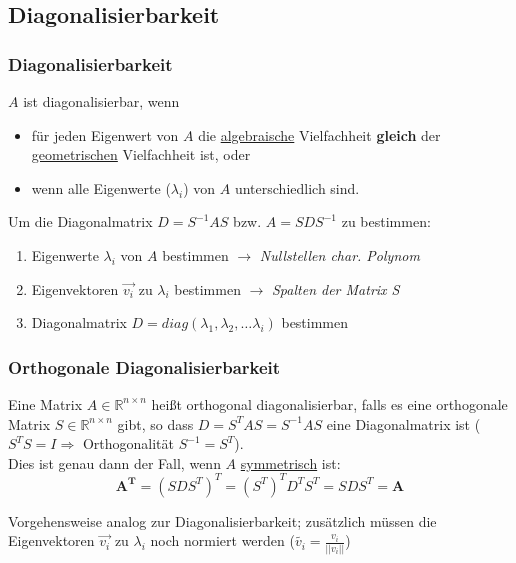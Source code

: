 \subsection{Diagonalisierbarkeit}

\subsubsection{Diagonalisierbarkeit}
\(A\) ist diagonalisierbar, wenn
\begin{itemize}
    \item für jeden Eigenwert von \(A\) die \underline{algebraische} Vielfachheit \textbf{gleich} der \underline{geometrischen} Vielfachheit ist, oder
    \item wenn alle Eigenwerte (\(\lambda_i\)) von \(A\) unterschiedlich sind.
\end{itemize}

Um die Diagonalmatrix \(D = S^{-1}AS\) bzw. \(A=SDS^{-1}\) zu bestimmen:
\begin{enumerate}
    \item Eigenwerte \(\lambda_i\) von \(A\) bestimmen \(\rightarrow\) \textit{Nullstellen char. Polynom}
    \item Eigenvektoren \(\vec{v_i}\) zu \(\lambda_i\) bestimmen \(\rightarrow\) \textit{Spalten der Matrix S}
    \item Diagonalmatrix \(D = diag(\lambda_1, \lambda_2, \hdots \lambda_i)\) bestimmen
\end{enumerate}

\subsubsection{Orthogonale Diagonalisierbarkeit}

Eine Matrix \(A \in \mathbb{R}^{n \times n}\) heißt orthogonal diagonalisierbar, falls es eine orthogonale Matrix \(S \in \mathbb{R}^{n \times n}\) gibt, so dass \(D = S^T A S = S^{-1}AS\) eine Diagonalmatrix ist (\(S^T S = I \Rightarrow \) Orthogonalität \(S^{-1} = S^T\)).\\

Dies ist genau dann der Fall, wenn \(A\) \underline{symmetrisch}  ist:
\begin{equation*}
    \boldsymbol{A^T} = (S D S^T)^T = (S^T)^T D^T S^T = SDS^T = \boldsymbol{A}
\end{equation*}

Vorgehensweise analog zur Diagonalisierbarkeit; zusätzlich müssen die Eigenvektoren \(\vec{v_i}\) zu \(\lambda_i\) noch normiert werden (\(\tilde{v_i}=\frac{v_i}{||v_i||} \))
